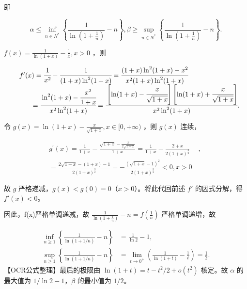\documentclass[11pt,fontset=fandol]{ctexart}
\begin{document}
即

\[
\alpha \leq \operatorname* { i n f } _ { n \in N ^ { \ast } } \left\{ \frac { 1 } { \ln ( 1 + \displaystyle \frac { 1 } { n } ) } - n \right\} , \beta \geq \operatorname* { s u p } _ { n \in N ^ { \ast } } \left\{ \frac { 1 } { \ln ( 1 + \displaystyle \frac { 1 } { n } ) } - n \right\} .
\]

\(f ( x ) = { \frac { 1 } { \ln ( 1 + x ) } } - { \frac { 1 } { x } } , x > 0\)
，则

\[
{ \begin{array} { r l } & { f ^ { \prime } ( x ) = { \cfrac { 1 } { { x } ^ { 2 } } } - { \cfrac { 1 } { ( 1 + x ) \ln ^ { 2 } ( 1 + x ) } } = { \cfrac { ( 1 + x ) \ln ^ { 2 } ( 1 + x ) - x ^ { 2 } } { x ^ { 2 } ( 1 + x ) \ln ^ { 2 } ( 1 + x ) } } } \\ & { \qquad = { \cfrac { \ln ^ { 2 } ( 1 + x ) - { \cfrac { x ^ { 2 } } { 1 + x } } } { x ^ { 2 } \ln ^ { 2 } ( 1 + x ) } } = { \cfrac { \left[ \ln ( 1 + x ) - { \cfrac { x } { \sqrt { 1 + x } } } \right] \left[ \ln ( 1 + x ) + { \cfrac { x } { \sqrt { 1 + x } } } \right] } { x ^ { 2 } \ln ^ { 2 } ( 1 + x ) } } . } \end{array} }
\]

令
\(g ( x ) = \ln ( 1 + x ) - { \frac { x } { \sqrt { 1 + x } } } , x \in [ 0 , + \infty )\)
，则 \(g ( x )\) 连续，

\[
\begin{array} { r } { g ^ { \prime } ( x ) = \displaystyle \frac { 1 } { 1 + x } - \frac { \sqrt { 1 + x } - \frac { x } { 2 \sqrt { 1 + x } } } { 1 + x } = \displaystyle \frac { 1 } { 1 + x } - \frac { 2 + x } { 2 ( 1 + x ) ^ { \frac { 3 } { 2 } } } \quad \mathrm { ~ , ~ } } \\ { = \displaystyle \frac { 2 \sqrt { 1 + x } - ( 1 + x ) - 1 } { 2 ( 1 + x ) ^ { \frac { 3 } { 2 } } } = - \frac { ( \sqrt { 1 + x } - 1 ) ^ { 2 } } { 2 ( 1 + x ) ^ { \frac { 3 } { 2 } } } < 0 , x > 0 } \end{array}
\]

故 \(g\) 严格递减，\(g(x)<g(0)=0\)（\(x>0\)）。将此代回前述 \(f'\)
的因式分解，得 \(f'(x)<0\)。

因此，f(x)严格单调递减，故
\(\frac { 1 } { \ln ( 1 + \frac { 1 } { n } ) } - n = f ( \frac { 1 } { n } )\)
严格单调递增，故

\[
\begin{aligned}
\inf_{n\ge1}\left\{\frac1{\ln(1+1/n)}-n\right\}&=\frac1{\ln2}-1,\\
\sup_{n\ge1}\left\{\frac1{\ln(1+1/n)}-n\right\}
&=\lim_{t\to0^+}\left(\frac1{\ln(1+t)}-\frac1t\right)=\frac12.
\end{aligned}
\] 【OCR公式整理】最后的极限由 \(\ln(1+t)=t-t^2/2+o(t^2)\) 核定。故
\(\alpha\) 的最大值为 \(1/\ln2-1\)，\(\beta\) 的最小值为 \(1/2\)。
\end{document}
